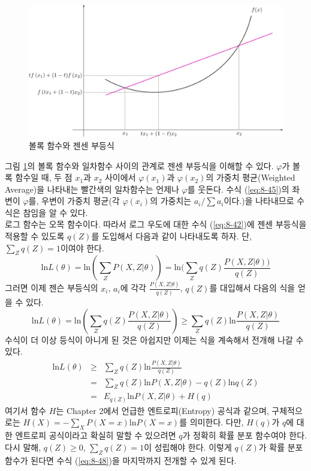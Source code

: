 \documentclass[a4paper]{oblivoir}
\begin{document}
\begin{figure}[ht] \centering 
\includegraphics[scale=1.0]{fig8_13.png} 
\caption{볼록 함수와 젠센 부등식}
\label{fig:8-13}
\end{figure}

그림 \ref{fig:8-13}의 볼록 함수와 일차함수 사이의 관계로 젠센 부등식을 이해할 수 있다. $\varphi$가 볼록 함수일 때, 두 점 $x_1$과 $x_2$ 사이에서  $\varphi(x_1)$과 $\varphi(x_2)$의 가중치 평균(Weighted Average)을 나타내는 빨간색의 일차함수는 언제나 $\varphi$를 웃돈다. 수식 (\ref{eq:8-45})의 좌변이 $\varphi$를, 우변이 가중치 평균(각 $\varphi(x_{i})$의 가중치는 $a_{i}/\sum a_{i}$이다.)을 나타내므로 수식은 참임을 알 수 있다.  \\     

로그 함수는 오목 함수이다. 따라서 로그 우도에 대한 수식 (\ref{eq:8-42})에 젠센 부등식을 적용할 수 있도록 $q(Z)$를 도입해서 다음과 같이 나타내도록 하자. 단, $\sum_{Z} q(Z)=1$이여야 한다.  
\begin{equation}
\textrm{ln} L(\theta) =  \textrm{ln} (\sum_{Z} P(X, Z|\theta)) = \textrm{ln} (\sum_{Z} q(Z) \frac{P(X, Z|\theta))}{q(Z)} \label{eq:8-46}
\end{equation}
그러면 이제 젠슨 부등식의 $x_i$, $a_i$에 각각 $\frac{P(X, Z|\theta)}{q(Z)}$, $q(Z)$를 대입해서 다음의 식을 얻을 수 있다. 
\begin{equation}
\textrm{ln} L(\theta) =  \textrm{ln} (\sum_{Z} q(Z) \frac{P(X, Z|\theta)}{q(Z)}) \geq \sum_{Z} q(Z) \textrm{ln} \frac{P(X, Z|\theta)}{q(Z)} \label{eq:8-47}
\end{equation}
수식이 더 이상 등식이 아니게 된 것은 아쉽지만 이제는 식을 계속해서 전개해 나갈 수 있다.  
\begin{eqnarray}
\textrm{ln} L(\theta) & \geq & \sum_{Z} q(Z) \textrm{ln} \frac{P(X, Z|\theta)}{q(Z)} \nonumber  \\
& = & \sum_{Z} q(Z) \textrm{ln} P(X, Z|\theta) - q(Z) \textrm{ln} q(Z) \nonumber  \\
& = & E_{q(Z)} \textrm{ln} P(X, Z|\theta) + H(q)  \label{eq:8-48} 
\end{eqnarray}
여기서 함수 $H$는 Chapter 2에서 언급한 엔트로피(Entropy) 공식과 같으며, 구체적으로는 $H(X) = -\sum_{X} P(X=x) \textrm{ln} P(X=x)$를 의미한다. 다만, $H(q)$가 $q$에 대한 엔트로피 공식이라고 확실히 말할 수 있으려면 $q$가 정확히 확률 분포 함수여야 한다. 다시 말해, $q(Z) \geq 0$, $\sum_{Z} q(Z)=1$이 성립해야 한다. 이렇게 $q(Z)$가 확률 분포 함수가 된다면  수식 (\ref{eq:8-48})을 마지막까지 전개할 수 있게 된다. \\
\end{document}
